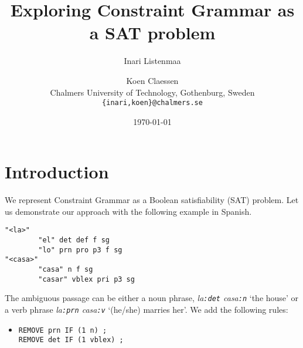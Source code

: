\documentclass[11pt]{article}
\title{Exploring Constraint Grammar as a SAT problem}
\author{Inari Listenmaa \and Koen Claessen \\
  Chalmers University of Technology, Gothenburg, Sweden \\
  {\tt \{inari,koen\}@chalmers.se} }
\date{\today}
\begin{document}
\maketitle



\section{Introduction}

We represent Constraint Grammar \cite{karlsson1995constraint} 
as a Boolean satisfiability (SAT) problem.
Let us demonstrate our approach with the following example in Spanish.

\begin{verbatim}
"<la>"
        "el" det def f sg
        "lo" prn pro p3 f sg
"<casa>"
        "casa" n f sg
        "casar" vblex pri p3 sg
\end{verbatim}

The ambiguous passage can be either a noun phrase, \emph{la\texttt{:det} casa\texttt{:n}} 
`the house'  or a verb phrase \emph{la\texttt{:prn} casa\texttt{:v}} `(he/she) marries her'. 
We add the following rules:

\begin{itemize}
\item [] \texttt{REMOVE prn IF (1 n) ;} \\
             \texttt{REMOVE det IF (1 vblex) ;}
\end{itemize}
\end{document}
